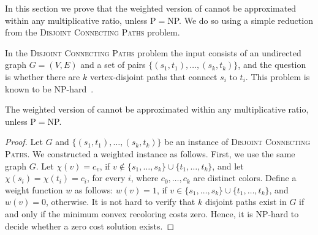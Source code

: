 \label{sec:hard}

In this section we prove that the weighted version of \TWOCR{} cannot
be approximated within any multiplicative ratio, unless P$=$NP.  We
do so using a simple reduction from the 
\textsc{Disjoint Connecting Paths} problem.

In the \textsc{Disjoint Connecting Paths} problem the input consists
of an undirected graph $G=(V,E)$ and a set of pairs $\{(s_1,
t_1), \ldots, (s_k, t_k)\}$, and the question is whether there are $k$
vertex-disjoint paths that connect $s_i$ to $t_i$.  This problem is
known to be NP-hard~\cite{karp1972reducibility}.

\begin{theorem}
The weighted version of \TWOCR{} cannot be approximated within any
 multiplicative ratio, unless P$=$NP.
\end{theorem}
\begin{proof}
Let $G$ and $\{(s_1, t_1), \ldots, (s_k, t_k)\}$ be an instance
of \textsc{Disjoint Connecting Paths}.  We constructed a
weighted \TWOCR{} instance as follows.  First, we use the same graph
$G$.  Let $\chi(v) = c_v$, if
$v \not\in \{s_1,\ldots,s_k\} \cup \{t_1,\ldots,t_k\}$, and let
$\chi(s_i) = \chi(t_i) = c_i$, for every $i$, where $c_0, \ldots, c_k$
are distinct colors.
%
Define a weight function $w$ as follows: $w(v) = 1$, if
$v \in \{s_1,\ldots,s_k\} \cup \{t_1,\ldots,t_k\}$, and $w(v) = 0$,
otherwise.
%
It is not hard to verify that $k$ disjoint paths exist in $G$ if and
only if the minimum convex recoloring costs zero.  Hence, it is
NP-hard to decide whether a zero cost solution exists.
\end{proof}
